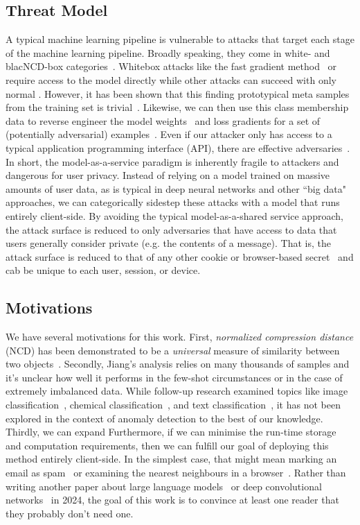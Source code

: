 \documentclass[conference]{IEEEtran}
\begin{document}
\subsection{Threat Model}
\label{threat}
A typical machine learning pipeline is vulnerable to attacks that target each stage of the machine learning pipeline. Broadly speaking, they come in white- and blacNCD-box categories~\cite{meyers}. Whitebox attacks like the fast gradient method~\cite{fgm} or~\cite{deepfool} require access to the model directly while other attacks can succeed with only normal . However, it has been shown that this finding prototypical meta samples from the training set is trivial~\cite{chakraborty_adversarial_2018}. Likewise, we can then use this class membership data to reverse engineer the model weights~\cite{} and loss gradients for a set of (potentially adversarial) examples~\cite{}. Even if our attacker only has access to a typical application programming interface (API), there are effective adversaries~\cite{hopskipjump}. In short, the model-as-a-service paradigm is inherently fragile to attackers and dangerous for user privacy. Instead of relying on a model trained on massive amounts of user data, as is typical in deep neural networks and other ``big data" approaches, we can categorically sidestep these attacks with a model that runs entirely client-side. By avoiding the typical model-as-a-shared service approach, the attack surface is reduced to only adversaries that have access to data that users generally consider private (e.g. the contents of a message). That is, the attack surface is reduced to that of any other cookie or browser-based secret~\cite{} and cab be unique to each user, session, or device.

\subsection{Motivations} 
We have several motivations for this work. 
First, \textit{normalized compression distance} (NCD) has been demonstrated to be a \textit{universal} measure of similarity between two objects~\cite{ncd}.
Secondly, Jiang's analysis relies on many thousands of samples and it's unclear how well it performs in the few-shot circumstances or in the case of extremely imbalanced data. 
While follow-up research examined topics like image classification~\cite{opitz2023gzip}, chemical classification~\cite{weinreich2023parameter}, and text classification~\cite{nishida2011tweet}, it has not been explored in the context of anomaly detection to the best of our knowledge.
Thirdly, we can expand 
Furthermore, if we can minimise the run-time storage and computation requirements, then we can fulfill our goal of deploying this method entirely client-side.
In the simplest case, that might mean marking an email as spam~\cite{} or examining the nearest neighbours in a browser~\cite{}. Rather than writing another paper about large language models~\cite{} or deep convolutional networks~\cite{} in 2024, the goal of this work is to convince at least one reader that they probably don't need one.
 
\end{document}

